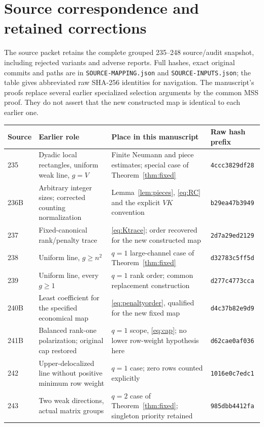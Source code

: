 \appendix
\section{Source correspondence and retained corrections}\label{sec:correspondence}
The source packet retains the complete grouped 235--248 source/audit snapshot,
including rejected variants and adverse reports. Full hashes, exact original
commits and paths are in \texttt{SOURCE-MAPPING.json} and
\texttt{SOURCE-INPUTS.json}; the table gives abbreviated raw SHA-256 identities
for navigation. The manuscript's proofs replace several earlier specialized
selection arguments by the common MSS proof. They do not assert that the new
constructed map is identical to each earlier one.

\begingroup\small
\begin{longtable}{@{}p{}p{}p{}p{}@{}}
\toprule
Source & Earlier role & Place in this manuscript & Raw hash prefix\\
\midrule\endhead
235 & Dyadic local rectangles, uniform weak line, $g=V$ & Finite Neumann and
piece estimates; special case of Theorem~\ref{thm:fixed} & \texttt{4ccc3829df28}\\
236B & Arbitrary integer sizes; corrected counting normalization &
Lemma~\ref{lem:pieces}, \eqref{eq:RC} and the explicit $VK$ convention & \texttt{b29ea47b3949}\\
237 & Fixed-canonical rank/penalty trace & \eqref{eq:Ktrace}; order recovered
for the new constructed map & \texttt{2d7a29ed2129}\\
238 & Uniform line, $g\geq n^2$ & $q=1$ large-channel case of
Theorem~\ref{thm:fixed} & \texttt{d32783c5ff5d}\\
239 & Uniform line, every $g\geq1$ & $q=1$ rank order; common replacement
construction & \texttt{d277c4773cca}\\
240B & Least coefficient for the specified economical map &
\eqref{eq:penaltyorder}, qualified for the new fixed map & \texttt{d4c37b82e9d9}\\
241B & Balanced rank-one polarization; original cap restored &
$q=1$ scope, \eqref{eq:cap}; no lower row-weight hypothesis here & \texttt{d62cae0af036}\\
242 & Upper-delocalized line without positive minimum row weight &
$q=1$ case; zero rows counted explicitly & \texttt{1016e0c7edc1}\\
243 & Two weak directions, actual matrix groups & $q=2$ case of
Theorem~\ref{thm:fixed}; singleton priority retained & \texttt{985dbb4412fa}\\

\end{longtable}

